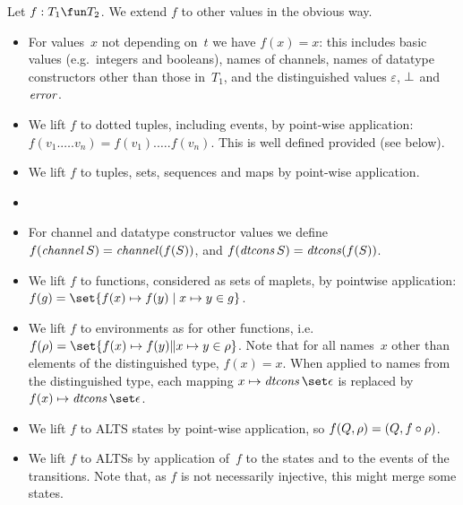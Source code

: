 Let $f : T_1 \fun T_2$.  We extend $f$ to other
values in the obvious way.
\begin{itemize}
\item For values~$x$ not depending on~$t$ we have $f(x) = x$: this includes
  basic values (e.g.~integers and booleans), names of channels, names of
  datatype constructors other than those in~$T_1$, and the distinguished values
  $\varepsilon$, $\perp$ and $\mathord{\it error}$.

\item We lift $f$ to dotted tuples, including events, by point-wise
  application: $f(v_1.\ldots.v_n) = f(v_1).\ldots.f(v_n)$.  This is well
  defined provided  (see below).

\item We lift $f$ to tuples, sets, sequences and maps by point-wise
  application.

\item {}

\item For channel and datatype constructor values we define
  $f(\mathop{\it channel} S) = \mathop{\it channel} (f(S))$, and
  $f(\mathop{\it dtcons} S) = \mathop{\it dtcons} (f(S))$.

\item We lift $f$ to functions, considered as sets of maplets, by pointwise
  application: $f (g) = \set{ f(x) \mapsto f(y) \mid x \mapsto y \in g }$.

\item We lift $f$ to environments as for other functions, i.e.~$f(\rho) =
  \set{f(x) \mapsto f(y) \| x \mapsto y \in \rho}$.  Note that for all
  names~$x$ other than elements of the distinguished type, $f(x) = x$.  When
  applied to names from the distinguished type, each mapping $x \mapsto
  \dtcons\set\epsilon$ is replaced by $f(x) \mapsto \dtcons\set\epsilon$.


\item We lift $f$ to ALTS states by point-wise application, so $f(Q,\rho) =
  (Q, f\circ\rho)$. 

\item We lift $f$ to ALTSs by application of~$f$ to the states and to the
  events of the transitions.  Note that, as $f$ is not necessarily injective,
  this might merge some states.
\end{itemize}



